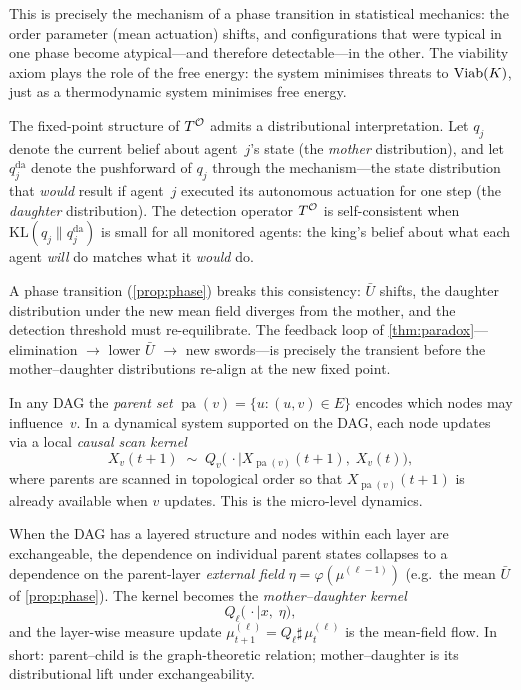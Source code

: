 \begin{remark}\label{rem:statmech}
This is precisely the mechanism of a phase transition in statistical
mechanics: the order parameter (mean actuation) shifts, and
configurations that were typical in one phase become atypical---and
therefore detectable---in the other. The viability axiom plays the role
of the free energy: the system minimises threats to $\mathrm{Viab}(K)$, just
as a thermodynamic system minimises free energy.
\end{remark}

\begin{remark}
\label{rem:mother-daughter}
The fixed-point structure of $T^{\mathcal{O}}$ admits a distributional
interpretation.  Let $q_j$ denote the current belief about
agent~$j$'s state (the \emph{mother} distribution), and let
$q_j^{\mathrm{da}}$ denote the pushforward of $q_j$ through
the mechanism---the state distribution that \emph{would} result
if agent~$j$ executed its autonomous actuation for one step
(the \emph{daughter} distribution).  The detection operator
$T^{\mathcal{O}}$ is self-consistent when
$\mathrm{KL}(q_j \| q_j^{\mathrm{da}})$ is small for all
monitored agents: the king's belief about what each agent
\emph{will} do matches what it \emph{would} do.

A phase transition (\cref{prop:phase}) breaks this consistency:
$\bar{U}$ shifts, the daughter distribution under the new mean
field diverges from the mother, and the detection threshold
must re-equilibrate.  The feedback loop of
\cref{thm:paradox}---elimination $\to$ lower $\bar{U}$ $\to$
new swords---is precisely the transient before the
mother--daughter distributions re-align at the new fixed point.
\end{remark}

\begin{remark}
\label{rem:parent-daughter-bridge}
In any DAG the \emph{parent set}
$\operatorname{pa}(v) = \{u : (u, v) \in E\}$ encodes
which nodes may influence~$v$.  In a dynamical system
supported on the DAG, each node updates via a local
\emph{causal scan kernel}
\[
  X_v(t{+}1) \;\sim\;
  Q_v\!\bigl(\,\cdot \mid X_{\operatorname{pa}(v)}(t{+}1),\;
  X_v(t)\bigr),
\]
where parents are scanned in topological order so that
$X_{\operatorname{pa}(v)}(t{+}1)$ is already available when
$v$ updates.  This is the micro-level dynamics.

When the DAG has a layered structure and nodes within each
layer are exchangeable, the dependence on individual parent
states collapses to a dependence on the parent-layer
\emph{external field} $\eta = \varphi(\mu^{(\ell-1)})$
(e.g.\ the mean $\bar{U}$ of \cref{prop:phase}).  The kernel
becomes the \emph{mother--daughter kernel}
\[
  Q_\ell\!\bigl(\,\cdot \mid x,\;\eta\bigr),
\]
and the layer-wise measure update
$\mu^{(\ell)}_{t+1} = Q_\ell \sharp\, \mu^{(\ell)}_t$
is the mean-field flow.  In short: parent--child is the
graph-theoretic relation; mother--daughter is its
distributional lift under exchangeability.
\end{remark}

